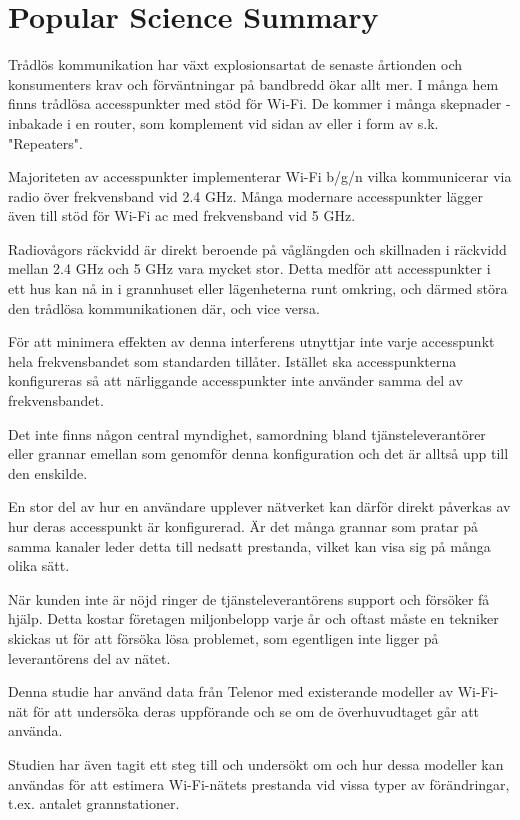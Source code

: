 \chapter*{Popular Science Summary}

Trådlös kommunikation har växt explosionsartat de senaste årtionden och
konsumenters krav och förväntningar på bandbredd ökar allt mer. I många hem
finns trådlösa accesspunkter med stöd för Wi-Fi. De kommer i många skepnader
- inbakade i en router, som komplement vid sidan av eller i form av s.k.
"Repeaters".

Majoriteten av accesspunkter implementerar Wi-Fi b/g/n vilka kommunicerar via
radio över frekvensband vid 2.4 GHz. Många modernare accesspunkter lägger även
till stöd för Wi-Fi ac med frekvensband vid 5 GHz.

Radiovågors räckvidd är direkt beroende på våglängden och skillnaden i räckvidd
mellan 2.4 GHz och 5 GHz vara mycket stor. Detta medför att accesspunkter i
ett hus kan nå in i grannhuset eller lägenheterna runt omkring, och därmed störa
den trådlösa kommunikationen där, och vice versa.

För att minimera effekten av denna interferens utnyttjar inte varje accesspunkt
hela frekvensbandet som standarden tillåter. Istället ska accesspunkterna
konfigureras så att närliggande accesspunkter inte använder samma del av
frekvensbandet.

Det inte finns någon central myndighet, samordning bland tjänsteleverantörer
eller grannar emellan som genomför denna konfiguration och det är alltså upp
till den enskilde.

En stor del av hur en användare upplever nätverket kan därför direkt påverkas av
hur deras accesspunkt är konfigurerad. Är det många grannar som pratar på samma
kanaler leder detta till nedsatt prestanda, vilket kan visa sig på många olika
sätt.

När kunden inte är nöjd ringer de tjänsteleverantörens support och försöker få
hjälp. Detta kostar företagen miljonbelopp varje år och oftast måste en tekniker
skickas ut för att försöka lösa problemet, som egentligen inte ligger på
leverantörens del av nätet.

Denna studie har använd data från Telenor med existerande modeller av Wi-Fi-nät
för att undersöka deras uppförande och se om de överhuvudtaget går att använda.

Studien har även tagit ett steg till och undersökt om och hur dessa modeller kan
användas för att estimera Wi-Fi-nätets prestanda vid vissa typer av
förändringar, t.ex. antalet grannstationer.
